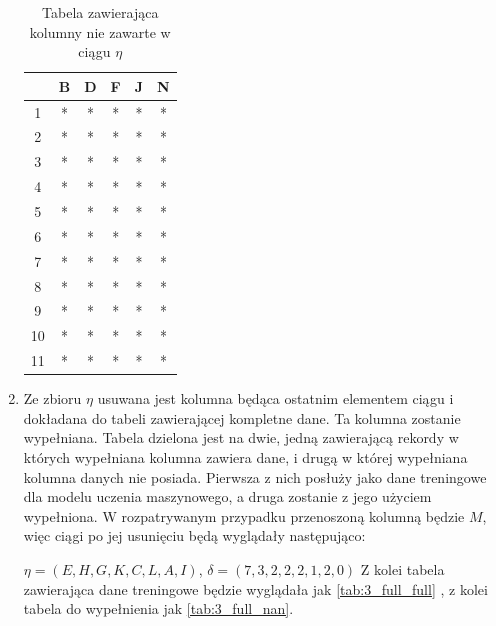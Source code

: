 \documentclass[12pt,twoside]{article}
\begin{document}
\begin{enumerate}[label=\arabic*), leftmargin=1.25cm]
          \begin{table}[ht]
              \caption{Tabela zawierająca kolumny nie zawarte w ciągu $\eta$}
              \centering
              \begin{tabular}{|c|c|c|c|c|c|}
                  \hline
                     & B & D & F & J & N \\ \hline
                  1  & * & * & * & * & * \\ \hline
                  2  & * & * & * & * & * \\ \hline
                  3  & * & * & * & * & * \\ \hline
                  4  & * & * & * & * & * \\ \hline
                  5  & * & * & * & * & * \\ \hline
                  6  & * & * & * & * & * \\ \hline
                  7  & * & * & * & * & * \\ \hline
                  8  & * & * & * & * & * \\ \hline
                  9  & * & * & * & * & * \\ \hline
                  10 & * & * & * & * & * \\ \hline
                  11 & * & * & * & * & * \\ \hline
              \end{tabular}
              \label{tab:3_full}
          \end{table}
          \FloatBarrier



    \item Ze zbioru $\eta$ usuwana jest kolumna będąca ostatnim elementem ciągu
          i dokładana do tabeli zawierającej kompletne dane. Ta kolumna zostanie wypełniana.
          Tabela dzielona jest na dwie, jedną zawierającą rekordy w których wypełniana kolumna zawiera dane,
          i drugą w której wypełniana kolumna danych nie posiada. Pierwsza z nich posłuży jako dane treningowe dla modelu uczenia maszynowego,
          a druga zostanie z jego użyciem wypełniona.
          W rozpatrywanym przypadku przenoszoną kolumną będzie $M$, więc ciągi po jej usunięciu będą wyglądały następująco:

          $\eta=(E,H,G,K,C,L,A,I)$, $\delta=(7,3,2,2,2,1,2,0)$
          Z kolei tabela zawierająca dane treningowe będzie wyglądała jak \ref{tab:3_full_full} , z kolei tabela do wypełnienia jak \ref{tab:3_full_nan}.


\end{enumerate}
\end{document}
